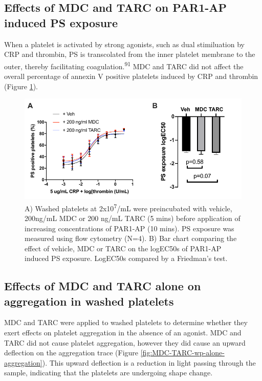 \documentclass[11pt,twoside]{bristolthesis}
\begin{document}
\hypertarget{effects-of-mdc-and-tarc-on-par1-ap-induced-ps-exposure}{%
\subsection{Effects of MDC and TARC on PAR1-AP induced PS exposure}\label{effects-of-mdc-and-tarc-on-par1-ap-induced-ps-exposure}}

When a platelet is activated by strong agonists, such as dual stimiluation by CRP and thrombin, PS is transcolated from the inner platelet membrane to the outer, thereby facilitating coagulation.\textsuperscript{91} MDC and TARC did not affect the overall percentage of annexin V positive platelets induced by CRP and thrombin (Figure \ref{fig:MDC-TARC-PS-exposure}).



\begin{figure}
\includegraphics{figure/Chemokines/Layouts/MDC_TARC_PS_exposure_layout} \caption[The effect of the chemokines MDC and TARC on PAR1-AP induced PS exposure]{A) Washed platelets at 2x10\textsuperscript{7}/mL were preincubated with vehicle, 200ng/mL MDC or 200 ng/mL TARC (5 mins) before application of increasing concentrations of PAR1-AP (10 mins). PS exposure was measured using flow cytometry (N=4). B) Bar chart comparing the effect of vehicle, MDC or TARC on the logEC50s of PAR1-AP induced PS exposure. LogEC50s compared by a Friedman's test.}\label{fig:MDC-TARC-PS-exposure}
\end{figure}
\hypertarget{effects-of-mdc-and-tarc-alone-on-aggregation-in-washed-platelets}{%
\subsection{Effects of MDC and TARC alone on aggregation in washed platelets}\label{effects-of-mdc-and-tarc-alone-on-aggregation-in-washed-platelets}}

MDC and TARC were applied to washed platelets to determine whether they exert effects on platelet aggregation in the absence of an agonist. MDC and TARC did not cause platelet aggregation, however they did cause an upward deflection on the aggregation trace (Figure \ref{fig:MDC-TARC-wp-alone-aggregation}). This upward deflection is a reduction in light passing through the sample, indicating that the platelets are undergoing shape change.
\end{document}
